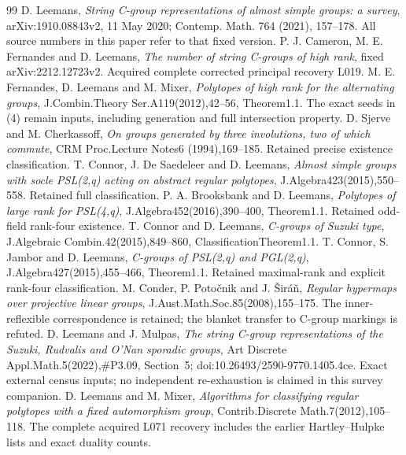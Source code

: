 \documentclass[11pt]{article}
\begin{document}
\begin{thebibliography}{99}
 D. Leemans, \emph{String C-group representations of almost
simple groups: a survey}, arXiv:1910.08843v2, 11 May 2020; Contemp. Math. 764
(2021), 157--178. All source numbers in this paper refer to that fixed version.
 P. J. Cameron, M. E. Fernandes and D. Leemans,
\emph{The number of string C-groups of high rank}, fixed
arXiv:2212.12723v2. Acquired complete corrected principal recovery L019.
 M. E. Fernandes, D. Leemans and M. Mixer,
\emph{Polytopes of high rank for the alternating groups},
J.Combin.Theory Ser.A119(2012),42--56, Theorem1.1. The exact seeds in (4)
remain inputs, including generation and full intersection property.
 D. Sjerve and M. Cherkassoff, \emph{On groups generated by
three involutions, two of which commute}, CRM Proc.Lecture Notes6
(1994),169--185. Retained precise existence classification.
 T. Connor, J. De Saedeleer and D. Leemans,
\emph{Almost simple groups with socle PSL(2,q) acting on abstract regular
polytopes}, J.Algebra423(2015),550--558. Retained full classification.
 P. A. Brooksbank and D. Leemans,
\emph{Polytopes of large rank for PSL(4,q)}, J.Algebra452(2016),390--400,
Theorem1.1. Retained odd-field rank-four existence.
 T. Connor and D. Leemans, \emph{C-groups of Suzuki type},
J.Algebraic Combin.42(2015),849--860, ClassificationTheorem1.1.
 T. Connor, S. Jambor and D. Leemans,
\emph{C-groups of PSL(2,q) and PGL(2,q)}, J.Algebra427(2015),455--466,
Theorem1.1. Retained maximal-rank and explicit rank-four classification.
 M. Conder, P. Poto\v cnik and J. \v Sir\'a\v n,
\emph{Regular hypermaps over projective linear groups},
J.Aust.Math.Soc.85(2008),155--175. The inner-reflexible correspondence
is retained; the blanket transfer to C-group markings is refuted.
 D. Leemans and J. Mulpas,
\emph{The string C-group representations of the Suzuki, Rudvalis and
O'Nan sporadic groups}, Art Discrete Appl.Math.5(2022),\#P3.09,
Section~5; doi:10.26493/2590-9770.1405.4ce. Exact external census inputs;
no independent re-exhaustion is claimed in this survey companion.
 D. Leemans and M. Mixer, \emph{Algorithms for
classifying regular polytopes with a fixed automorphism group},
Contrib.Discrete Math.7(2012),105--118. The complete acquired L071
recovery includes the earlier Hartley--Hulpke lists and exact duality counts.
\end{thebibliography}
\end{document}
